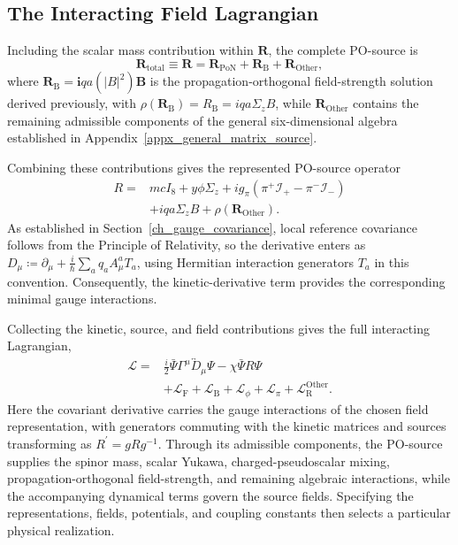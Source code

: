 \subsection{The Interacting Field Lagrangian}
Including the scalar mass contribution within $\mathbf{R}$, the complete PO-source is
\begin{equation}
    \mathbf{R}_{\mathrm{total}} \equiv \mathbf{R}= \mathbf{R}_{\mathrm{PoN}} + \mathbf{R}_{\mathrm{B}} + \mathbf{R}_{\mathrm{Other}},
\end{equation}
where $\mathbf{R}_{\mathrm{B}}=\mathbf{i}qa\left(|B|^{2}\right)\mathbf{B}$ is the propagation-orthogonal field-strength solution derived previously, with $\rho(\mathbf{R}_{\mathrm{B}})=R_{\mathrm{B}}=iqa\Sigma_{z}B$, while $\mathbf{R}_{\mathrm{Other}}$ contains the remaining admissible components of the general six-dimensional algebra established in Appendix~\ref{appx_general_matrix_source}.

Combining these contributions gives the represented PO-source operator
\begin{equation}\label{eq_full_geometric_source_operator}
\begin{split}
    R ={}& mcI_{8} + y\phi\Sigma_{z} + ig_{\pi}\left(\pi^{+}\mathcal{I}_{+} - \pi^{-}\mathcal{I}_{-}\right) \\
    & +iqa\Sigma_{z}B+\rho\left(\mathbf{R}_{\mathrm{Other}}\right).
\end{split}
\end{equation}
As established in Section~\ref{ch_gauge_covariance}, local reference covariance follows from the Principle of Relativity, so the derivative enters as $D_{\mu}\coloneqq\partial_{\mu}+\frac{i}{\hbar}\sum_{a}q_{a}A_{\mu}^{a}T_{a}$, using Hermitian interaction generators $T_{a}$ in this convention. Consequently, the kinetic-derivative term provides the corresponding minimal gauge interactions.

Collecting the kinetic, source, and field contributions gives the full interacting Lagrangian,
\begin{equation}\label{eq_full_field_lagrangian}
\begin{split}
    \mathcal{L} ={}& \frac{i}{2}\bar{\Psi}\Gamma^{\mu}\overleftrightarrow{D}_{\mu}\Psi - \chi\bar{\Psi}R\Psi \\
    & + \mathcal{L}_{\mathrm{F}} + \mathcal{L}_{\mathrm{B}} + \mathcal{L}_{\phi} + \mathcal{L}_{\pi} + \mathcal{L}_{\mathrm{R}}^{\mathrm{Other}}.
\end{split}
\end{equation}
Here the covariant derivative carries the gauge interactions of the chosen field representation, with generators commuting with the kinetic matrices and sources transforming as $R^{\prime}=gRg^{-1}$. Through its admissible components, the PO-source supplies the spinor mass, scalar Yukawa, charged-pseudoscalar mixing, propagation-orthogonal field-strength, and remaining algebraic interactions, while the accompanying dynamical terms govern the source fields. Specifying the representations, fields, potentials, and coupling constants then selects a particular physical realization.

